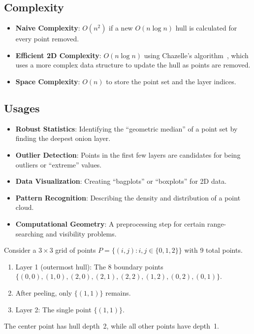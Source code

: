 \subsection{Complexity}

\begin{itemize}
\item \textbf{Naive Complexity}: $O(n^2)$ if a new $O(n \log n)$ hull is calculated for every point removed.
\item \textbf{Efficient 2D Complexity}: $O(n \log n)$ using Chazelle's algorithm~\cite{chazelle1985}, which uses a more complex data structure to update the hull as points are removed.
\item \textbf{Space Complexity}: $O(n)$ to store the point set and the layer indices.
\end{itemize}

\subsection{Usages}

\begin{itemize}
\item \textbf{Robust Statistics}: Identifying the ``geometric median'' of a point set by finding the deepest onion layer.
\item \textbf{Outlier Detection}: Points in the first few layers are candidates for being outliers or ``extreme'' values.
\item \textbf{Data Visualization}: Creating ``bagplots'' or ``boxplots'' for 2D data.
\item \textbf{Pattern Recognition}: Describing the density and distribution of a point cloud.
\item \textbf{Computational Geometry}: A preprocessing step for certain range-searching and visibility problems.
\end{itemize}

\begin{example}\label{ex:onion_peeling}
Consider a $3 \times 3$ grid of points $P = \{(i,j) : i,j \in \{0,1,2\}\}$ with 9 total points.
\begin{enumerate}
\item Layer 1 (outermost hull): The 8 boundary points $\{(0,0),(1,0),(2,0),(2,1),(2,2),(1,2),(0,2),(0,1)\}$.
\item After peeling, only $\{(1,1)\}$ remains.
\item Layer 2: The single point $\{(1,1)\}$.
\end{enumerate}
The center point has hull depth~2, while all other points have depth~1.
\end{example}

